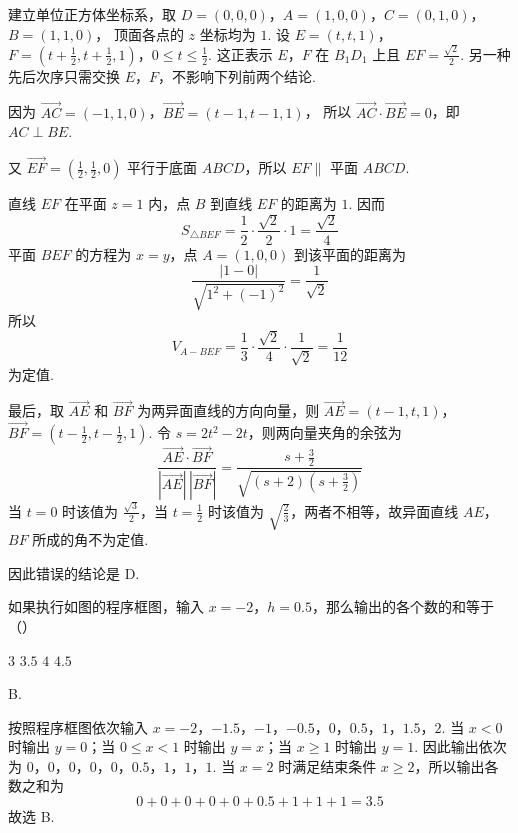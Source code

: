 \begin{solution}
建立单位正方体坐标系，取
\(D=(0,0,0)\)，\(A=(1,0,0)\)，\(C=(0,1,0)\)，\(B=(1,1,0)\)，
顶面各点的 \(z\) 坐标均为 \(1\). 设
\(E=(t,t,1)\)，\(F=\left(t+\frac12,t+\frac12,1\right)\)，\(0\leqslant t\leqslant\frac12\).
这正表示 \(E\)，\(F\) 在 \(B_{1}D_{1}\) 上且 \(EF=\frac{\sqrt2}{2}\). 另一种先后次序只需交换 \(E\)，\(F\)，不影响下列前两个结论.

因为
\(\overrightarrow{AC}=(-1,1,0)\)，\(\overrightarrow{BE}=(t-1,t-1,1)\)，
所以 \(\overrightarrow{AC}\cdot\overrightarrow{BE}=0\)，即 \(AC\perp BE\).

又 \(\overrightarrow{EF}=(\frac12,\frac12,0)\) 平行于底面 \(ABCD\)，所以 \(EF\parallel\) 平面 \(ABCD\).

直线 \(EF\) 在平面 \(z=1\) 内，点 \(B\) 到直线 \(EF\) 的距离为 \(1\). 因而
\[
S_{\triangle BEF}=\frac12\cdot\frac{\sqrt2}{2}\cdot1=\frac{\sqrt2}{4}
\]
平面 \(BEF\) 的方程为 \(x=y\)，点 \(A=(1,0,0)\) 到该平面的距离为
\[
\frac{|1-0|}{\sqrt{1^{2}+(-1)^{2}}}=\frac{1}{\sqrt2}
\]
所以
\[
V_{A-BEF}=\frac13\cdot\frac{\sqrt2}{4}\cdot\frac1{\sqrt2}=\frac1{12}
\]
为定值.

最后，取 \(\overrightarrow{AE}\) 和 \(\overrightarrow{BF}\) 为两异面直线的方向向量，则
\(\overrightarrow{AE}=(t-1,t,1)\)，\(\overrightarrow{BF}=\left(t-\frac12,t-\frac12,1\right)\).
令 \(s=2t^{2}-2t\)，则两向量夹角的余弦为
\[
\frac{\overrightarrow{AE}\cdot\overrightarrow{BF}}
{|\overrightarrow{AE}|\,|\overrightarrow{BF}|}
=\frac{s+\frac32}{\sqrt{(s+2)(s+\frac32)}}
\]
当 \(t=0\) 时该值为 \(\frac{\sqrt3}{2}\)，当 \(t=\frac12\) 时该值为 \(\sqrt{\frac23}\)，两者不相等，故异面直线 \(AE\)，\(BF\) 所成的角不为定值.

因此错误的结论是 D.
\end{solution}

\begin{problem}
如果执行如图的程序框图，输入 \(x = -2\)，\(h = 0.5\)，那么输出的各个数的和等于（\quad）

\FloatBarrier

\choices
    {\(3\)}
    {\(3.5\)}
    {\(4\)}
    {\(4.5\)}
\end{problem}

\begin{answer}
B.
\end{answer}

\begin{solution}
按照程序框图依次输入 \(x=-2\)，\(-1.5\)，\(-1\)，\(-0.5\)，\(0\)，\(0.5\)，\(1\)，\(1.5\)，\(2\). 当 \(x<0\) 时输出 \(y=0\)；当 \(0\leqslant x<1\) 时输出 \(y=x\)；当 \(x\geqslant1\) 时输出 \(y=1\). 因此输出依次为
\(0\)，\(0\)，\(0\)，\(0\)，\(0\)，\(0.5\)，\(1\)，\(1\)，\(1\).
当 \(x=2\) 时满足结束条件 \(x\geqslant2\)，所以输出各数之和为
\[
0+0+0+0+0+0.5+1+1+1=3.5
\]
故选 B.
\end{solution}

